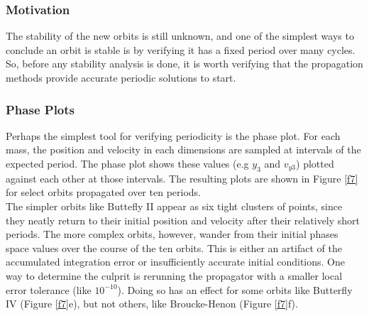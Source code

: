 \documentclass[12pt]{article}
\begin{document}
\subsubsection{Motivation}
The stability of the new orbits is still unknown, and one of the simplest ways to conclude an orbit is stable is by verifying it has a fixed period over many cycles. So, before any stability analysis is done, it is worth verifying that the propagation methods provide accurate periodic solutions to start.
\subsubsection{Phase Plots}
Perhaps the simplest tool for verifying periodicity is the phase plot. For each mass, the position and velocity in each dimensions are sampled at intervals of the expected period. The phase plot shows these values (e.g $y_3$ and $v_{y3}$) plotted against each other at those intervals. The resulting plots are shown in Figure \ref{f7} for select orbits propagated over ten periods. \\

The simpler orbits like Buttefly II appear as six tight clusters of points, since they neatly return to their initial position and velocity after their relatively short periods. The more complex orbits, however, wander from their initial phases space values over the course of the ten orbits. This is either an artifact of the accumulated integration error or insufficiently accurate initial conditions. One way to determine the culprit is rerunning the propagator with a smaller local error tolerance (like $10^{-10}$). Doing so has an effect for some orbits like Butterfly IV (Figure \ref{f7}e), but not others, like Broucke-Henon (Figure \ref{f7}f). \\
\end{document}
